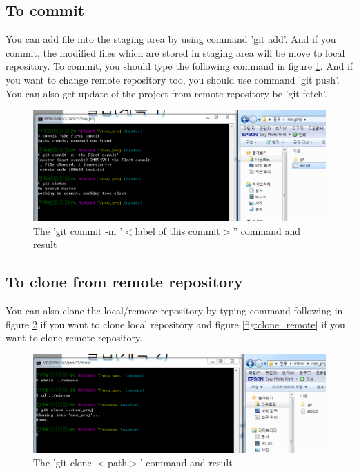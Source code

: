 \documentclass{article}
\begin{document}
    \subsection {To commit}
    You can add file into the staging area by using command 'git add'. And if you commit, the modified files which are stored in staging area will be move to local repository. To commit, you should type the following command in figure \ref{fig:commit}. And if you want to change remote repository too, you should use command 'git push'. You can also get update of the project from remote repository  be 'git fetch'. 
    \begin{figure}[h!]
    \centering
    \includegraphics[scale=0.5]{git_commit}
    \caption{The 'git commit -m '$<$label of this commit$>$'' command and result}
    \label{fig:commit}
    \end{figure}
    
    \subsection {To clone from remote repository}
    You can also clone the local/remote repository by typing command following in figure \ref{fig:clone_local} if you want to clone local repository and figure \ref{fig:clone_remote} if you want to clone remote repository.
    
    \begin{figure}[h!]
    \centering
    \includegraphics[scale=0.5]{git_clone_local}
    \caption{The 'git clone $<$path$>$' command and result}
    \label{fig:clone_local}
    \end{figure}
    
\end{document}
